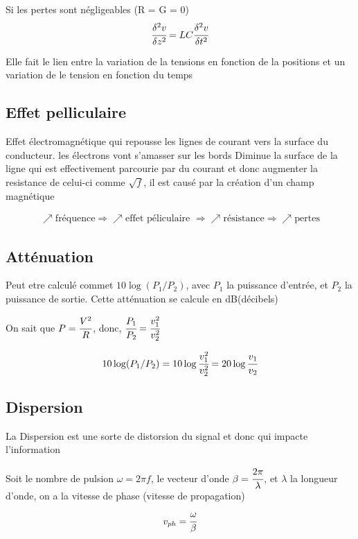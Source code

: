 		Si les pertes sont négligeables (R = G = 0)
		\begin{equation}
			\cfrac{\delta^2 v}{\delta z^2} = LC\cfrac{\delta^2 v}{\delta t^2}
		\end{equation}
		
		Elle fait le lien entre la variation de la tensions en fonction de la positions et un variation de le tension en fonction du temps
		
		
	\subsection{Effet pelliculaire}
		Effet électromagnétique qui repousse les lignes de courant  vers la surface du conducteur. les électrons vont s'amasser sur les bords
		Diminue la surface de la ligne qui est effectivement parcourie par du courant et donc augmenter la resistance de celui-ci comme $\sqrt{f}$, il est causé par la création d'un champ magnétique
		
		\begin{align*}
			\nearrow \text{fréquence} \Rightarrow \nearrow \text{effet péliculaire }\Rightarrow \nearrow \text{résistance} \Rightarrow \nearrow \text{pertes}
		\end{align*}
			
	\subsection{Atténuation}
		Peut etre calculé commet $10\log(P_{1}/P_{2})$, avec $P_1$ la puissance d'entrée, et $P_2$ la puissance de sortie. Cette atténuation se calcule en dB(décibels)
		
		On sait que $P = \cfrac{V^2}{R}$, donc, $\cfrac{P_1}{P_2} = \cfrac{v_{1}^{2}}{v_{2}^{2}}$
		
		\begin{equation}
			10\log(P_{1}/P_{2}) = 10\log\cfrac{v_{1}^{2}}{v_{2}^{2}} = 20\log\cfrac{v_{1}}{v_{2}}
		\end{equation}
		
	\subsection{Dispersion}
		La Dispersion est une sorte de distorsion du signal et donc qui impacte l'information
		
		Soit le nombre de pulsion $\omega = 2 \pi f$, le vecteur d'onde $\beta = \cfrac{2\pi}{\lambda}$, et $\lambda$ la longueur d'onde, on a la vitesse de phase (vitesse de propagation)
		\begin{equation}
			v_{ph} = \cfrac{\omega}{\beta}
		\end{equation}
		
